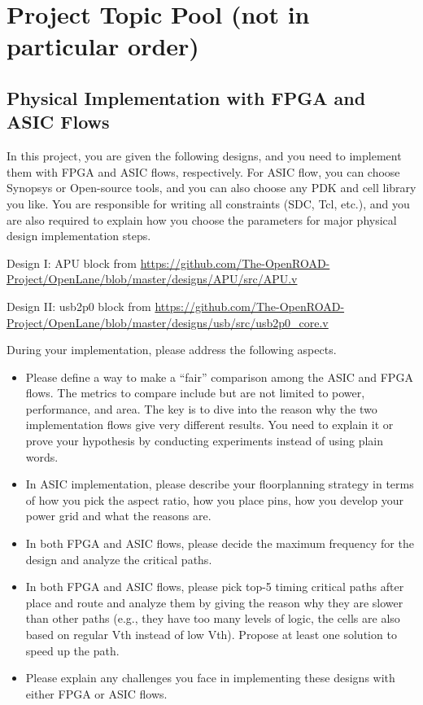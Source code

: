 \documentclass[a4paper,12pt,twoside]{article}
\begin{document}
\section{Project Topic Pool (not in particular order)} 
\label{topicpool}
\subsection{Physical Implementation with FPGA and ASIC Flows}
In this project, you are given the following designs, and you need to implement them with FPGA and ASIC flows, respectively. For ASIC flow, you can choose Synopsys or Open-source tools, and you can also choose any PDK and cell library you like. You are responsible for writing all constraints (SDC, Tcl, etc.), and you are also required to explain how you choose the parameters for major physical design implementation steps. 

Design I: APU block from \url{https://github.com/The-OpenROAD-Project/OpenLane/blob/master/designs/APU/src/APU.v}

Design II: usb2p0 block from \url{https://github.com/The-OpenROAD-Project/OpenLane/blob/master/designs/usb/src/usb2p0_core.v}

During your implementation, please address the following aspects.
\begin{itemize}
    \item Please define a way to make a ``fair'' comparison among the ASIC and FPGA flows. The metrics to compare include but are not limited to power, performance, and area. The key is to dive into the reason why the two implementation flows give very different results. You need to explain it or prove your hypothesis by conducting experiments instead of using plain words.
    \item In ASIC implementation, please describe your floorplanning strategy in terms of how you pick the aspect ratio, how you place pins, how you develop your power grid and what the reasons are.
    \item In both FPGA and ASIC flows, please decide the maximum frequency for the design and analyze the critical paths.
    \item In both FPGA and ASIC flows, please pick top-5 timing critical paths after place and route and analyze them by giving the reason why they are slower than other paths (e.g., they have too many levels of logic, the cells are also based on regular Vth instead of low Vth). Propose at least one solution to speed up the path.
    \item Please explain any challenges you face in implementing these designs with either FPGA or ASIC flows.    
\end{itemize}
\end{document}
